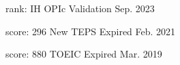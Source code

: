 

\begin{cventries}

  \cventry
    {rank: IH} %
    {OPIc} %
    {Validation} %
    {Sep. 2023} %
    {
    }
    

  \cventry
    {score: 296} %
    {New TEPS} %
    {Expired} %
    {Feb. 2021} %
    {
    }
    
  \cventry
    {score: 880} %
    {TOEIC} %
    {Expired} %
    {Mar. 2019} %
    {
    }

\end{cventries}
